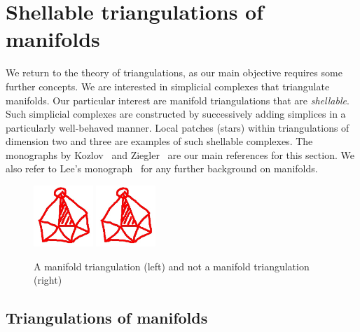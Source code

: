 \documentclass[10pt,letterpaper]{article}
\newcommand\cye[1]{%
  \protect\leavevmode
  \begingroup
    \color{red!35!yellow}%
    #1%
  \endgroup
}
\begin{document}
\section{Shellable triangulations of manifolds}\label{section:advancedtriangulations}

We return to the theory of triangulations,
as our main objective requires some further concepts.
We are interested in simplicial complexes that triangulate manifolds. 
Our particular interest are manifold triangulations that are \emph{shellable}.
Such simplicial complexes are constructed by successively adding simplices in a particularly well-behaved manner. 
\cye{Local} patches \cye{(stars)} within triangulations of dimension two and three are examples of such shellable complexes. 
The monographs by Kozlov~\cite{kozlov2008combinatorial} and Ziegler~\cite{ziegler1995lectures} are our main references for this section. 
We also refer to Lee's monograph~\cite{lee2011topological} for any further background on manifolds. 

\begin{figure}[h]
\centerline{\includegraphics[width=0.2\textwidth]{homotopic_ball.jpg} \quad \includegraphics[width=0.2\textwidth]{homotopic_ball.jpg}}
\label{figure:not_manifold_triang}
\caption{A manifold triangulation (left) and not a manifold triangulation (right)}
\end{figure}


\subsection{Triangulations of manifolds}
\end{document}
